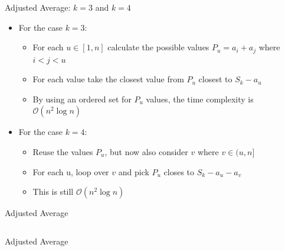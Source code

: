 \documentclass[11pt,pdf, aspectratio=169]{beamer}
\begin{document}
  \begin{frame}{Adjusted Average: $k=3$ and $k=4$}
    \begin{itemize}
      \item For the case $k=3$:
      \begin{itemize}
        \item For each $u \in [1,n]$ calculate the possible values $P_u = a_i+a_j$ where $i < j < u$
        \item For each value take the closest value from $P_u$ closest to $S_k - a_u$
        \item By using an ordered set for $P_u$ values, the time complexity is $\mathcal{O}(n^2\log n)$
      \end{itemize}
      \item For the case $k=4$:
      \begin{itemize}
        \item Reuse the values $P_u$, but now also consider $v$ where $v \in (u, n]$
        \item For each u, loop over $v$ and pick $P_u$ closes to $S_k -a_u - a_v$
        \item This is still $\mathcal{O}(n^2\log n)$
      \end{itemize}
    \end{itemize}
  \end{frame}
  \begin{frame}[containsverbatim]{Adjusted Average}
    \inputminted[fontsize=\tiny]{python}{code/session-4/bapc-a-1.py}
  \end{frame}
  \begin{frame}[containsverbatim]{Adjusted Average}
    \inputminted[fontsize=\tiny]{python}{code/session-4/bapc-a-2.py}
  \end{frame}
\end{document}
